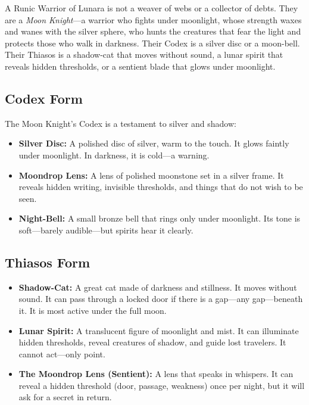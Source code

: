 A Runic Warrior of Lunara is not a weaver of webs or a collector of debts. They are a \textit{Moon Knight}—a warrior who fights under moonlight, whose strength waxes and wanes with the silver sphere, who hunts the creatures that fear the light and protects those who walk in darkness. Their Codex is a silver disc or a moon-bell. Their Thiasos is a shadow-cat that moves without sound, a lunar spirit that reveals hidden thresholds, or a sentient blade that glows under moonlight.

\subsection{Codex Form}

The Moon Knight's Codex is a testament to silver and shadow:

\begin{itemize}
\item \textbf{Silver Disc:} A polished disc of silver, warm to the touch. It glows faintly under moonlight. In darkness, it is cold—a warning.
\item \textbf{Moondrop Lens:} A lens of polished moonstone set in a silver frame. It reveals hidden writing, invisible thresholds, and things that do not wish to be seen.
\item \textbf{Night-Bell:} A small bronze bell that rings only under moonlight. Its tone is soft—barely audible—but spirits hear it clearly.
\end{itemize}

\subsection{Thiasos Form}

\begin{itemize}
\item \textbf{Shadow-Cat:} A great cat made of darkness and stillness. It moves without sound. It can pass through a locked door if there is a gap—any gap—beneath it. It is most active under the full moon.
\item \textbf{Lunar Spirit:} A translucent figure of moonlight and mist. It can illuminate hidden thresholds, reveal creatures of shadow, and guide lost travelers. It cannot act—only point.
\item \textbf{The Moondrop Lens (Sentient):} A lens that speaks in whispers. It can reveal a hidden threshold (door, passage, weakness) once per night, but it will ask for a secret in return.
\end{itemize}

